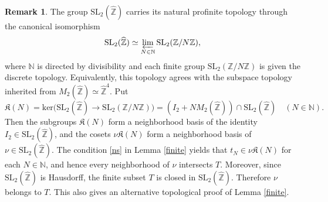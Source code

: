 \documentclass[reqno,11pt]{article}
\theoremstyle{plain} %
\theoremstyle{definition} %
\newtheorem{remark}[theorem]{\indent\sc Remark}
\begin{document}
\begin{remark}\label{alternative}
The group $\mathrm{SL}_2(\widehat{\mathbb{Z}})$ carries its natural profinite topology 
through the canonical isomorphism
\begin{equation*}
\mathrm{SL}_2(\widehat{\mathbb{Z}})\simeq\varprojlim_{N\in\mathbb{N}}\mathrm{SL}_2(\mathbb{Z}/N\mathbb{Z}),
\end{equation*}
where $\mathbb{N}$ is directed by divisibility and each 
finite group $\mathrm{SL}_2(\mathbb{Z}/N\mathbb{Z})$
is given the discrete topology. 
Equivalently, this topology agrees with the subspace topology 
inherited from $M_2(\widehat{\mathbb{Z}})\simeq\widehat{\mathbb{Z}}^4$. 
Put
\begin{equation*}
\mathfrak{K}(N)=\mathrm{ker}\big(\mathrm{SL}_2(\widehat{\mathbb{Z}})
\rightarrow\mathrm{SL}_2(\mathbb{Z}/N\mathbb{Z})\big)
=(I_2+NM_2(\widehat{\mathbb{Z}}))\cap\mathrm{SL}_2(\widehat{\mathbb{Z}})
\quad(N\in\mathbb{N}).
\end{equation*}
Then the subgroups $\mathfrak{K}(N)$ form a neighborhood basis of 
the identity $I_2\in\mathrm{SL}_2(\widehat{\mathbb{Z}})$,
and the cosets $\nu\mathfrak{K}(N)$ form a neighborhood basis of $\nu\in
\mathrm{SL}_2(\widehat{\mathbb{Z}})$. 
The condition \eqref{ns} in Lemma \ref{finite} yields that 
$t_N\in\nu\mathfrak{K}(N)$ for each $N\in\mathbb{N}$,
and hence every neighborhood of $\nu$ intersects $T$. 
Moreover, since $\mathrm{SL}_2(\widehat{\mathbb{Z}})$ is Hausdorff,
the finite subset $T$ is closed in $\mathrm{SL}_2(\widehat{\mathbb{Z}})$.
Therefore $\nu$ belongs to $T$. This also gives an alternative
topological proof of Lemma \ref{finite}.
\end{remark}
\end{document}
